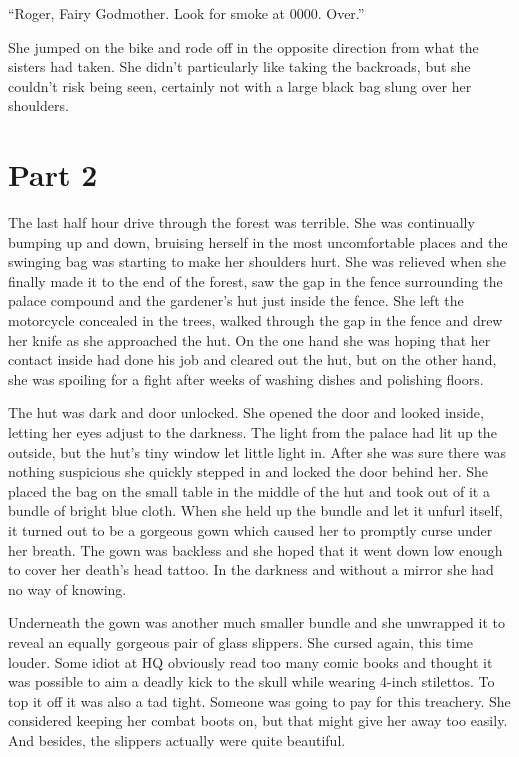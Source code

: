 \documentclass[12pt,letterpaper]{article}
\begin{document}
``Roger, Fairy Godmother. Look for smoke at 0000. Over.''

She jumped on the bike and rode off in the opposite direction from what the sisters had taken. She didn't particularly like taking the backroads, but she couldn't risk being seen, certainly not with a large black bag slung over her shoulders.

\section*{Part 2}

The last half hour drive through the forest was terrible. She was continually bumping up and down, bruising herself in the most uncomfortable places and the swinging bag was starting to make her shoulders hurt. She was relieved when she finally made it to the end of the forest, saw the gap in the fence surrounding the palace compound and the gardener's hut just inside the fence. She left the motorcycle concealed in the trees, walked through the gap in the fence and drew her knife as she approached the hut. On the one hand she was hoping that her contact inside had done his job and cleared out the hut, but on the other hand, she was spoiling for a fight after weeks of washing dishes and polishing floors.

The hut was dark and door unlocked. She opened the door and looked inside, letting her eyes adjust to the darkness. The light from the palace had lit up the outside, but the hut's tiny window let little light in. After she was sure there was nothing suspicious she quickly stepped in and locked the door behind her. She placed the bag on the small table in the middle of the hut and took out of it a bundle of bright blue cloth. When she held up the bundle and let it unfurl itself, it turned out to be a gorgeous gown which caused her to promptly curse under her breath. The gown was backless and she hoped that it went down low enough to cover her death's head tattoo. In the darkness and without a mirror she had no way of knowing.

Underneath the gown was another much smaller bundle and she unwrapped it to reveal an equally gorgeous pair of glass slippers. She cursed again, this time louder. Some idiot at HQ obviously read too many comic books and thought it was possible to aim a deadly kick to the skull while wearing 4-inch stilettos. To top it off it was also a tad tight. Someone was going to pay for this treachery. She considered keeping her combat boots on, but that might give her away too easily. And besides, the slippers actually were quite beautiful.
\end{document}
